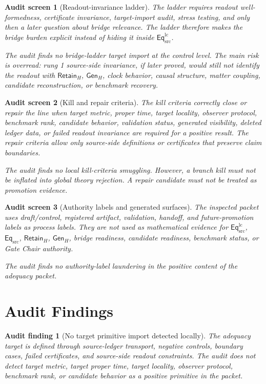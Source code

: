 \documentclass[11pt]{article}
\newcommand{\EqSrc}{\mathsf{Eq}_{\mathrm{src}}}
\newcommand{\EqLC}{\mathsf{Eq}_{\mathrm{src}}^{\mathrm{lc}}}
\newcommand{\RetainH}{\mathsf{Retain}_{H}}
\newcommand{\GenH}{\mathsf{Gen}_{H}}
\newtheorem{screen}{Audit screen}
\newtheorem{auditfinding}{Audit finding}
\begin{document}
\begin{screen}[Readout-invariance ladder]
The ladder requires readout well-formedness, certificate invariance,
target-import audit, stress testing, and only then a later question
about bridge relevance. The ladder therefore makes the bridge burden
explicit instead of hiding it inside \(\EqLC\).

The audit finds no bridge-ladder target import at the control level.
The main risk is overread: rung 1 source-side invariance, if later
proved, would still not identify the readout with \(\RetainH\),
\(\GenH\), clock behavior, causal structure, matter coupling, candidate
reconstruction, or benchmark recovery.
\end{screen}

\begin{screen}[Kill and repair criteria]
The kill criteria correctly close or repair the line when target metric,
proper time, target locality, observer protocol, benchmark rank,
candidate behavior, validation status, generated visibility, deleted
ledger data, or failed readout invariance are required for a positive
result. The repair criteria allow only source-side definitions or
certificates that preserve claim boundaries.

The audit finds no local kill-criteria smuggling. However, a branch kill
must not be inflated into global theory rejection. A repair candidate
must not be treated as promotion evidence.
\end{screen}

\begin{screen}[Authority labels and generated surfaces]
The inspected packet uses draft/control, registered artifact,
validation, handoff, and future-promotion labels as process labels.
They are not used as mathematical evidence for \(\EqLC\), \(\EqSrc\),
\(\RetainH\), \(\GenH\), bridge readiness, candidate readiness,
benchmark status, or Gate Chair authority.

The audit finds no authority-label laundering in the positive content of
the adequacy packet.
\end{screen}

\section{Audit Findings}

\begin{auditfinding}[No target primitive import detected locally]
The adequacy target is defined through source-ledger transport,
negative controls, boundary cases, failed certificates, and source-side
readout constraints. The audit does not detect target metric, target
proper time, target locality, observer protocol, benchmark rank, or
candidate behavior as a positive primitive in the packet.
\end{auditfinding}
\end{document}
